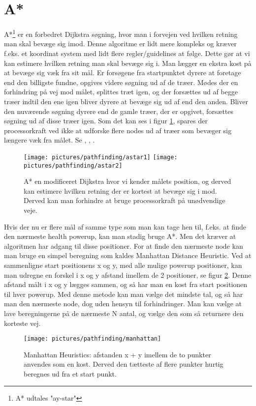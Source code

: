 \section{A*}
A*\footnote{A* udtales "ay-star"} er en forbedret Dijkstra søgning, hvor man i forvejen ved hvilken retning man skal bevæge sig imod. Denne algoritme er lidt mere kompleks og kræver f.eks. et koordinat system med lidt flere regler/guidelines at følge. Dette gør at vi kan estimere hvilken retning man skal bevæge sig i. Man lægger en ekstra kost på at bevæge sig væk fra sit mål. Er forsøgene fra startpunktet dyrere at foretage end den billigste fundne, opgives videre søgning ud af de træer. Mødes der en forhindring på vej mod målet, splittes træt igen, og der forsættes ud af begge træer indtil den ene igen bliver dyrere at bevæge sig ud af end den anden. Bliver den nuværende søgning dyrere end de gamle træer, der er opgivet, forsættes søgning ud af disse træer igen. Som det kan ses i figur \ref{dia:astar1}, spares der processorkraft ved ikke at udforske flere nodes ud af træer som bevæger sig længere væk fra målet. Se \textcite[241]{buckland}, \textcite{amitastar}, \textcite[215]{MillingtonFunge}.

\begin{figure}
	\begin{center}
		\texttt{[image: pictures/pathfinding/astar1]}
		\texttt{[image: pictures/pathfinding/astar2]}
		\caption{A* en modificeret Dijkstra hvor vi kender målets position, og derved kan estimere hvilken retning der er kortest at bevæge sig i mod. Derved kan man forhindre at bruge processorkraft på unødvendige veje.}
		\label{dia:astar1}
	\end{center}
\end{figure}

Hvis der nu er flere mål af samme type som man kan tage hen til, f.eks. at finde den nærmeste health powerup, kan man stadig bruge A*. Men det kræver at algoritmen har adgang til disse positioner. For at finde den nærmeste node kan man bruge en simpel beregning som kaldes Manhattan Distance Heuristic. Ved at sammenligne start positionens x og y, med alle mulige powerup positioner, kan man udregne en forskel i x og y afstand imellem de 2 positioner, se figur \ref{dia:manhattan}. Denne afstand målt i x og y lægges sammen, og så har man en kost fra start positionen til hver powerup. Med denne metode kan man vælge det mindste tal, og så har man den nærmeste node, dog uden hensyn til forhindringer. Man kan vælge at lave beregningerne på de nærmeste N antal, og vælge den som så returnere den korteste vej.

\begin{figure}
	\begin{center}
		\texttt{[image: pictures/pathfinding/manhattan]}
		\caption{Manhattan Heuristics: afstanden x + y imellem de to punkter anvendes som en kost. Derved den tætteste af flere punkter hurtig beregnes ud fra et start punkt.}
		\label{dia:manhattan}
	\end{center}
\end{figure}